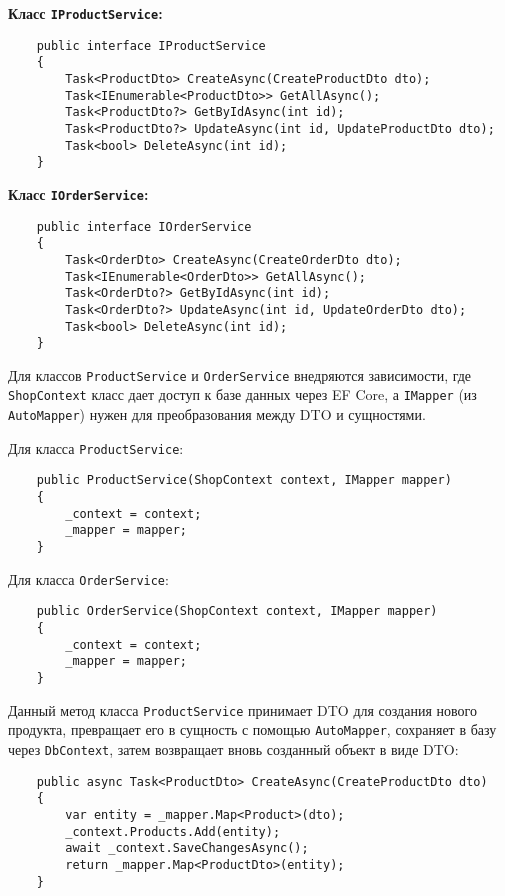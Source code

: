 \documentclass[a4paper,12pt]{report}
\begin{document}
\textbf{Класс \texttt{IProductService}:}
\begin{verbatim}
    public interface IProductService
    {
        Task<ProductDto> CreateAsync(CreateProductDto dto);
        Task<IEnumerable<ProductDto>> GetAllAsync();
        Task<ProductDto?> GetByIdAsync(int id);
        Task<ProductDto?> UpdateAsync(int id, UpdateProductDto dto);
        Task<bool> DeleteAsync(int id);
    }
\end{verbatim}

\textbf{Класс \texttt{IOrderService}:}
\begin{verbatim}
    public interface IOrderService
    {
        Task<OrderDto> CreateAsync(CreateOrderDto dto);
        Task<IEnumerable<OrderDto>> GetAllAsync();
        Task<OrderDto?> GetByIdAsync(int id);
        Task<OrderDto?> UpdateAsync(int id, UpdateOrderDto dto);
        Task<bool> DeleteAsync(int id);
    }
\end{verbatim}

Для классов \texttt{ProductService} и \texttt{OrderService} внедряются зависимости, 
где \texttt{ShopContext} класс дает доступ к базе данных через \acs{EF} Core, 
а \texttt{IMapper} (из \texttt{AutoMapper}) нужен для преобразования между 
\acs{DTO} и сущностями.

Для класса \texttt{ProductService}:
\begin{verbatim}
    public ProductService(ShopContext context, IMapper mapper)
    {
        _context = context;
        _mapper = mapper;
    }
\end{verbatim}

Для класса \texttt{OrderService}:
\begin{verbatim}
    public OrderService(ShopContext context, IMapper mapper)
    {
        _context = context;
        _mapper = mapper;
    }
\end{verbatim}

Данный метод класса \texttt{ProductService} принимает \acs{DTO} для создания нового продукта, 
превращает его в сущность с помощью \texttt{AutoMapper}, сохраняет 
в базу через \texttt{DbContext}, затем возвращает вновь созданный объект в виде \acs{DTO}:
\begin{verbatim}
    public async Task<ProductDto> CreateAsync(CreateProductDto dto)
    {
        var entity = _mapper.Map<Product>(dto);
        _context.Products.Add(entity);
        await _context.SaveChangesAsync();
        return _mapper.Map<ProductDto>(entity);
    }
\end{verbatim}
\end{document}
